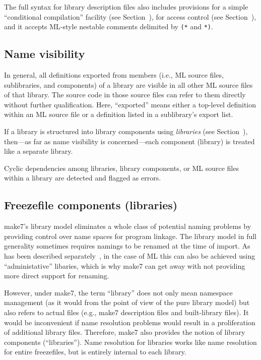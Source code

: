 The full syntax for library description files also includes provisions
for a simple ``conditional compilation'' facility (see
Section~), for access control (see
Section~), and it accepts ML-style nestable comments
delimited by \verb|(*| and \verb|*)|.

\subsection{Name visibility}

In general, all definitions exported from members (i.e., ML source
files, sublibraries, and components) of a library are visible in all
other ML source files of that library.  The source code in those
source files can refer to them directly without further qualification.
Here, ``exported'' means either a top-level definition within an ML
source file or a definition listed in a sublibrary's export list.

If a library is structured into library components using {\em libraries}
(see Section~), then---as far as name visibility is
concerned---each component (library) is treated like a separate library.

Cyclic dependencies among libraries, library components, or ML source
files within a library are detected and flagged as errors.

\subsection{Freezefile components (libraries)}
\label{sec:libraries}

make7's library model eliminates a whole class of potential naming problems
by providing control over name spaces for program linkage.  The library
model in full generality sometimes requires namings to be renamed at
the time of import. As has been described
separately~\cite{blume:appel:cm99}, in the case of ML this can also be
achieved using ``administative'' libaries, which is why make7 can get
away with not providing more direct support for renaming.

However, under make7, the term ``library'' does not only mean namespace
management (as it would from the point of view of the pure library
model) but also refers to actual files (e.g., make7
description files and built-library files).  It would be inconvenient
if name resolution problems would result in a proliferation of
additional library files.  Therefore, make7 also provides the notion of
library components (``libraries'').  Name resolution for libraries works
like name resolution for entire freezefiles, but is entirely
internal to each library.

